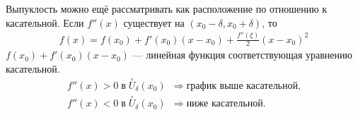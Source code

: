 \begin{note}
Выпуклость можно ещё рассматривать как расположение по отношению к касательной.
Если \(f''(x)\) существует на \((x_0 - \delta, x_0 + \delta)\), то
\begin{gather}
    f(x) = f(x_0) + f'(x_0)(x - x_0) + \frac{f''(\xi)}{2}(x - x_0)^2
\end{gather}
\(f(x_0) + f'(x_0)(x - x_0)\) --- линейная функция соответствующая уравнению касательной.
\begin{align}
    f''(x) > 0 \; \text{в} \; \overset{\circ}{U}_{\delta}(x_0) &\Rightarrow \; \text{график выше
        касательной,}\\
    f''(x) < 0 \; \text{в} \; \overset{\circ}{U}_{\delta}(x_0) &\Rightarrow \; \text{ниже
        касательной.}
\end{align}
\end{note}